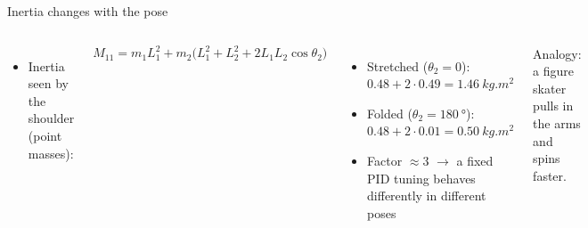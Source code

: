\documentclass[aspectratio=169,10pt]{beamer}
\begin{document}
\begin{frame}[t]{Inertia changes with the pose}
\begin{columns}[T,onlytextwidth]
\begin{itemize}\small
\item Inertia seen by the shoulder (point masses):
\end{itemize}
\begin{eqbox}
\small
\[ M_{11} = m_1L_1^2 + m_2\big(L_1^2+L_2^2+2L_1L_2\cos\theta_2\big) \]
\end{eqbox}
\begin{itemize}\small
\item Stretched ($\theta_2=0$): $0.48+2\cdot0.49=\SI{1.46}{kg.m^2}$
\item Folded ($\theta_2=\SI{180}{\degree}$): $0.48+2\cdot0.01=\SI{0.50}{kg.m^2}$
\item Factor $\approx 3$ $\rightarrow$ a fixed PID tuning behaves differently in different poses
\end{itemize}
\begin{notebox}Analogy: a figure skater pulls in the arms and spins faster.\end{notebox}
\end{columns}
\end{frame}
\end{document}
